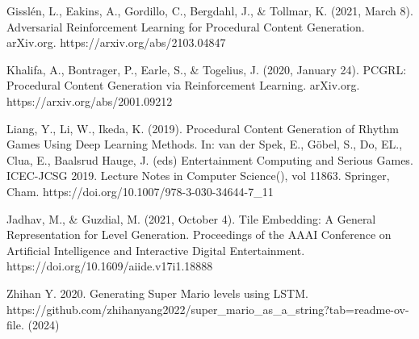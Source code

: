 \documentclass[runningheads]{llncs}
\begin{document}
\begin{thebibliography}{8}
Gisslén, L., Eakins, A., Gordillo, C., Bergdahl, J., \& Tollmar, K. (2021, March 8). Adversarial Reinforcement Learning for Procedural Content Generation. arXiv.org. https://arxiv.org/abs/2103.04847

Khalifa, A., Bontrager, P., Earle, S., \& Togelius, J. (2020, January 24). PCGRL: Procedural Content Generation via Reinforcement Learning. arXiv.org. https://arxiv.org/abs/2001.09212

Liang, Y., Li, W., Ikeda, K. (2019). Procedural Content Generation of Rhythm Games Using Deep Learning Methods. In: van der Spek, E., Göbel, S., Do, EL., Clua, E., Baalsrud Hauge, J. (eds) Entertainment Computing and Serious Games. ICEC-JCSG 2019. Lecture Notes in Computer Science(), vol 11863. Springer, Cham. https://doi.org/10.1007/978-3-030-34644-7\_11

Jadhav, M., \& Guzdial, M. (2021, October 4). Tile Embedding: A General Representation for Level Generation. Proceedings of the AAAI Conference on Artificial Intelligence and Interactive Digital Entertainment. https://doi.org/10.1609/aiide.v17i1.18888

Zhihan Y. 2020. Generating Super Mario levels using LSTM.
https://github.com/zhihanyang2022/super\_mario\_as\_a\_string?tab=readme-ov-file. (2024)


\end{thebibliography}
\end{document}
